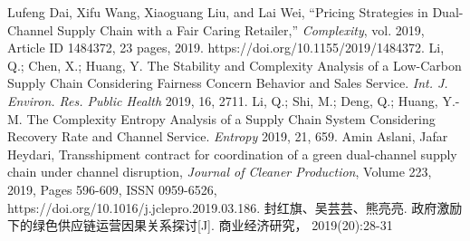 \documentclass{article}
\begin{document}
\begin{thebibliography}{1}
 Lufeng Dai, Xifu Wang, Xiaoguang Liu, and Lai Wei, “Pricing Strategies in Dual-Channel Supply Chain with a Fair Caring Retailer,” \emph{Complexity}, vol. 2019, Article ID 1484372, 23 pages, 2019. https://doi.org/10.1155/2019/1484372.
 Li, Q.; Chen, X.; Huang, Y. The Stability and Complexity Analysis of a Low-Carbon Supply Chain Considering Fairness Concern Behavior and Sales Service. \emph{Int. J. Environ. Res. Public Health} 2019, 16, 2711.
 Li, Q.; Shi, M.; Deng, Q.; Huang, Y.-M. The Complexity Entropy Analysis of a Supply Chain System Considering Recovery Rate and Channel Service. \emph{Entropy} 2019, 21, 659.
 Amin Aslani, Jafar Heydari, Transshipment contract for coordination of a green dual-channel supply chain under channel disruption, \emph{Journal of Cleaner Production}, Volume 223, 2019, Pages 596-609, ISSN 0959-6526, https://doi.org/10.1016/j.jclepro.2019.03.186.
 封红旗、吴芸芸、熊亮亮. 政府激励下的绿色供应链运营因果关系探讨[J]. 商业经济研究， 2019(20):28-31
\end{thebibliography}
\end{document}
